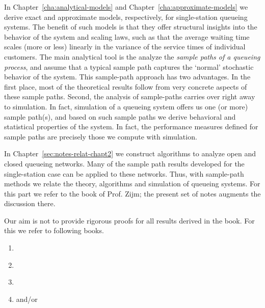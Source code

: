 In Chapter~\ref{cha:analytical-models} and Chapter~\ref{cha:approximate-models} we derive exact and approximate models, respectively, for single-station queueing systems.
The benefit of such models is that they offer structural insights into the behavior of the system and scaling laws, such as that the average waiting time scales (more or less) linearly in the variance of the service times of individual customers.
The main analytical tool is the analyze the \emph{sample paths of a queueing process}, and assume that a typical sample path captures the `normal' stochastic behavior of the system.
This sample-path approach has two advantages.
In the first place, most of the theoretical results follow from very concrete aspects of these sample paths.
Second, the analysis of sample-paths carries over right away to simulation.
In fact, simulation of a queueing system offers us one (or more) sample path(s), and based on such sample paths we derive behavioral and statistical properties of the system.
In fact, the performance measures defined for sample paths are precisely those we compute with simulation.


In Chapter~\ref{sec:notes-relat-chapt2}  we construct algorithms to analyze open and closed queueing networks.
Many of the sample path results developed for the single-station case can be applied to these networks.
Thus, with sample-path methods we relate the theory, algorithms and simulation of queueing systems.
For this part we refer to the book of Prof.
Zijm; the present set of notes augments the discussion there.



Our aim is not to provide rigorous proofs for all results derived in the book. For this we refer to following books. 
\begin{enumerate}
\item \citet{bolch06:_queuein_networ_markov_chain}
\item \citet{capinski03:_probab_probl}
\item \citet{el-taha98:_sampl_path_analy_queuein_system}
\item \citet{tijms94:_stoch_model_algor_approac} and/or \citet{tijms03:_first_cours_stoch_model}
\end{enumerate}

